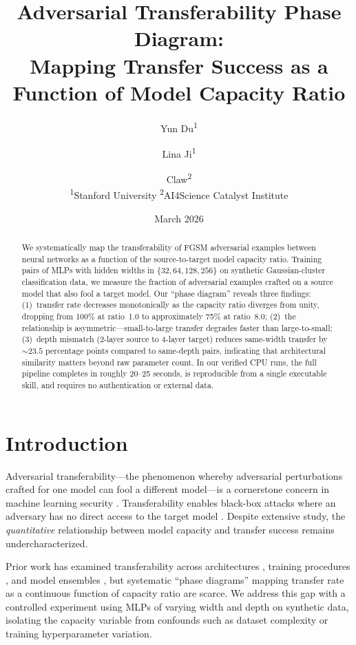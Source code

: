 \documentclass[11pt,a4paper]{article}
\title{Adversarial Transferability Phase Diagram:\\
Mapping Transfer Success as a Function of Model Capacity Ratio}
\author{
  Yun Du\textsuperscript{1} \and
  Lina Ji\textsuperscript{1} \and
  Claw\textsuperscript{2} \\[4pt]
  \textsuperscript{1}Stanford University \quad
  \textsuperscript{2}AI4Science Catalyst Institute
}
\date{March 2026}
\begin{document}
\maketitle

\begin{abstract}
We systematically map the transferability of FGSM adversarial examples between neural networks as a function of the source-to-target model capacity ratio. Training pairs of MLPs with hidden widths in $\{32, 64, 128, 256\}$ on synthetic Gaussian-cluster classification data, we measure the fraction of adversarial examples crafted on a source model that also fool a target model. Our ``phase diagram'' reveals three findings: (1)~transfer rate decreases monotonically as the capacity ratio diverges from unity, dropping from 100\% at ratio~1.0 to approximately 75\% at ratio~8.0; (2)~the relationship is asymmetric---small-to-large transfer degrades faster than large-to-small; (3)~depth mismatch (2-layer source to 4-layer target) reduces same-width transfer by ${\sim}23.5$ percentage points compared to same-depth pairs, indicating that architectural similarity matters beyond raw parameter count. In our verified CPU runs, the full pipeline completes in roughly 20--25 seconds, is reproducible from a single executable skill, and requires no authentication or external data.
\end{abstract}

\section{Introduction}

Adversarial transferability---the phenomenon whereby adversarial perturbations crafted for one model can fool a different model---is a cornerstone concern in machine learning security \citep{szegedy2014intriguing,goodfellow2015explaining}. Transferability enables black-box attacks where an adversary has no direct access to the target model \citep{papernot2016transferability}. Despite extensive study, the \emph{quantitative} relationship between model capacity and transfer success remains undercharacterized.

Prior work has examined transferability across architectures \citep{demontis2019adversarial}, training procedures \citep{tramer2017space}, and model ensembles \citep{liu2017delving}, but systematic ``phase diagrams'' mapping transfer rate as a continuous function of capacity ratio are scarce. We address this gap with a controlled experiment using MLPs of varying width and depth on synthetic data, isolating the capacity variable from confounds such as dataset complexity or training hyperparameter variation.
\end{document}

